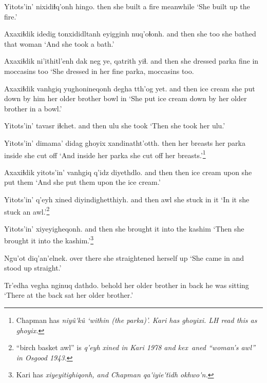 \documentclass[12pt]{article}
\begin{document}
\gll Yitots'in' nixidiɬq'onh hingo.
then {she built a fire} meanwhile
\glt `She built up the fire.'
\glend

\gll Axaxiɬdik idedig tonxididltanh eyigginh nuq'oɬonh.
{and then} {she too} {she bathed} that  woman
\glt `And she took a bath.'
\glend

\gll Axaxiɬdik ni'ithitl'enh dak neg ye, qatrith yiɬ.
{and then} {she dressed} parka fine in moccasins too
\glt `She dressed in her fine parka, moccasins too.
\glend

\gll Axaxiɬdik vanhgiq yughonineqonh degha   tth'og yet.
{and then} {ice cream}  {she put down by him} {her older brother} bowl in
\glt `She put ice cream down by her older brother in a bowl.'
\glend

\gll Yitots'in' tavasr iɬchet.
{and then} {ulu} {she took}
\glt `Then she took her ulu.'
\glend

\gll Yitots'in' dimama' didag  ghoyix xandinatht'otth.
then  {her breasts} {her parka} inside  {she cut off}
\glt `And inside her parka she cut off her breasts.'\footnote{Chapman has \em niy\^u\'{}k\^u \em `within (the parka)'. Kari has \em ghoyixi. \em LH read this as \em ghoyix.}
\glend

\gll Axaxiɬdik yitots'in' vanhgiq q'idz diyethdlo.
{and then} then  {ice cream} upon {she put them}
\glt `And she put them upon the ice cream.'
\glend

\gll Yitots'in' {q'eyh xined} diyindighetthiyh.
{and then} awl  {she stuck in it} 
\glt `In it she stuck an awl.'\footnote{``birch basket awl'' is \em q'eyh xined \em in Kari 1978 and \em kex\texthalflength\ aned \em ``woman's awl'' in Osgood 1943.}
\glend

\gll Yitots'in' xiyeyigheqonh.
{and then} {she brought it into the kashim}
\glt `Then she brought it into the kashim.'\footnote{Kari has \em xiyeyitighiqonh, \em and Chapman \em qa\'{}iyie\'{}t\u{\i}dh okhwo\'{}n.}
\glend

\gll Ngu'ot diq'an'elnek.
{over there} {she straightened herself up}
\glt `She came in and stood up straight.'
\glend

\gll Tr'edha vegha   nginuq dathdo.
behold  {her older brother} {in back} {he was sitting}
\glt `There at the back sat her older brother.'
\glend
\end{document}
